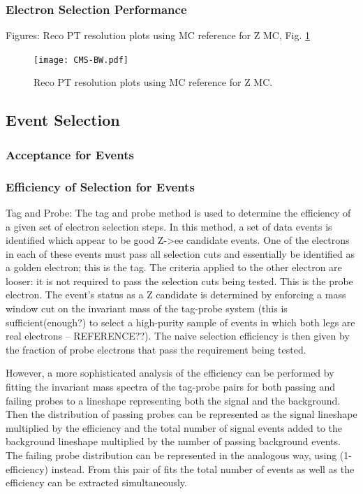 \subsubsection{Electron Selection Performance} %
Figures: Reco PT resolution plots using MC reference for Z MC, Fig. \ref{fig:RecoPtResolution}

 \begin{figure}[htb]
  \begin{center}
    \texttt{[image: CMS-BW.pdf]}
  \end{center}
  \caption[Reco PT resolution plots using MC reference for Z MC]{Reco PT resolution plots using MC reference for Z MC.}
  \label{fig:RecoPtResolution}
 \end{figure}


\subsection{\Zee Event Selection}
\subsubsection{Acceptance for \Zee Events}
\subsubsection{Efficiency of Selection for \Zee Events}
Tag and Probe:  The tag and probe method is used to determine the efficiency of a given set of electron selection steps.  
In this method, a set of data events is identified which appear to be good Z->ee candidate events.  
One of the electrons in each of these events must pass 
all selection cuts and essentially be identified as a golden electron; 
this is the tag.  
The criteria applied to the other electron are looser: it is not required to pass the selection cuts being tested.  
This is the probe electron.  
The event's status as a Z candidate is determined by enforcing a mass window cut on the invariant mass of the tag-probe system 
(this is sufficient(enough?) to select a high-purity sample of events in which both legs are real electrons -- REFERENCE??).  
The naive selection efficiency is then given by the fraction of probe electrons that pass the requirement being tested.  

However, a more sophisticated analysis of the efficiency can be performed by fitting the invariant mass spectra of the
tag-probe pairs for both passing and failing probes to a lineshape representing both the signal and the background.  
Then the distribution of passing probes can be represented as the signal lineshape multiplied by the efficiency and the
total number of signal events added to the background lineshape multiplied by the number of passing background events.  
The failing probe distribution can be represented in the analogous way, using (1-efficiency) instead.  
From this pair of fits the total number of events as well as the efficiency can be extracted simultaneously.  

